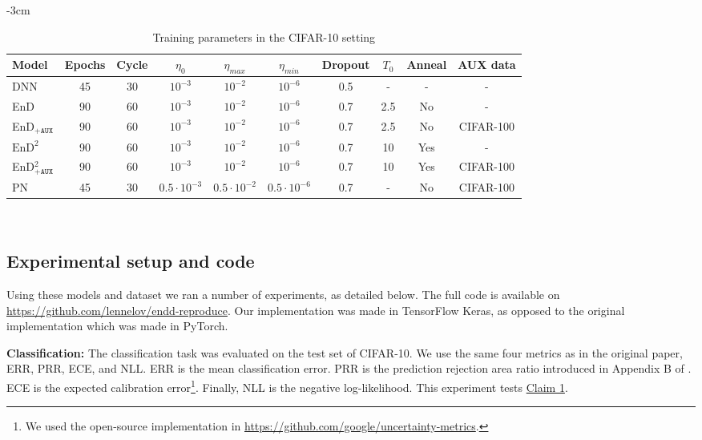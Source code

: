 \begin{table}
\centering
\caption{Training parameters in the CIFAR-10 setting}
\addtolength{\leftskip} {-3cm}
\addtolength{\rightskip}{-3cm}
\begin{tabular}{l||c|c|c|c|c|c|c|c|c}
\hline
Model & Epochs & Cycle &  $\eta_0$ & $\eta_{max}$ & $\eta_{min}$ & Dropout & $T_0$ & Anneal & AUX data \\ [0.5ex] 
\hline
\hline
DNN & 45 & 30 & $10^{-3}$ & $10^{-2}$ & $10^{-6}$ & 0.5 & - & - & - \\
EnD & 90 & 60 & $10^{-3}$ & $10^{-2}$ & $10^{-6}$ & 0.7 & 2.5 & No & - \\
EnD$_{\texttt{+AUX}}$ & 90 & 60 & $10^{-3}$ & $10^{-2}$ & $10^{-6}$ & 0.7 & 2.5 & No & CIFAR-100 \\
$\text{EnD}^2$ & 90 & 60 & $10^{-3}$ & $10^{-2}$ & $10^{-6}$ & 0.7 & 10 & Yes & - \\
EnD$^2_{\texttt{+AUX}}$ & 90 & 60 & $10^{-3}$ & $10^{-2}$ & $10^{-6}$ & 0.7 & 10 & Yes & CIFAR-100 \\
PN & 45 & 30 & $0.5 \cdot 10^{-3}$ & $0.5 \cdot 10^{-2}$ & $0.5 \cdot 10^{-6}$ & 0.7 & - & No & CIFAR-100 \\
\hline
\end{tabular}
\\ [1ex] 

\label{tab:cifar10-training}
\end{table}

\subsection{Experimental setup and code}
Using these models and dataset we ran a number of experiments, as detailed below. The full code is available on \href{https://github.com/lennelov/endd-reproduce}{https://github.com/lennelov/endd-reproduce}. Our implementation was made in TensorFlow Keras, as opposed to the original implementation which was made in PyTorch.

\textbf{Classification:} The classification task was evaluated on the test set of CIFAR-10. We use the same four metrics as in the original paper, ERR, PRR, ECE, and NLL. ERR is the mean classification error. PRR is the prediction rejection area ratio introduced in Appendix B of \cite{malinin2019ensemble}. ECE is the expected calibration error\footnote{We used the open-source implementation in \url{https://github.com/google/uncertainty-metrics}.}. Finally, NLL is the negative log-likelihood. This experiment tests \hyperlink{claim1}{Claim 1}. 


